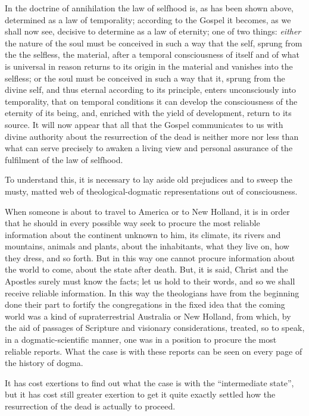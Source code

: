 \documentclass[12pt,a4paper,openany]{book}
\newcommand{\opage}[1]{\marginnote{\footnotesize\textit{[#1]}}}
\begin{document}
In the doctrine of annihilation the law of selfhood is, as has been
shown above, determined as a law of temporality; according to the Gospel
it becomes, as we shall now see, decisive to determine
as a law of eternity; one of two things: \emph{either} the nature of the soul
must be conceived in such a way that the self, sprung from the
\setcounter{footnote}{0}%
\opage{208}the selfless, the material, after a temporal consciousness of
itself and of what is universal in reason returns to its
origin in the material and vanishes into the selfless;
or the soul must be conceived in such a way that it, sprung
from the divine self, and thus eternal according to its principle,
enters unconsciously into temporality, that on temporal
conditions it can develop the consciousness of the eternity
of its being, and, enriched with the yield of development, return
to its source. It will now appear that all that
the Gospel communicates to us with divine authority about
the resurrection of the dead is neither more nor less than
what can serve precisely to awaken a living view
and personal assurance of the fulfilment of the law of selfhood.

To understand this, it is necessary to lay aside
old prejudices and to sweep the musty, matted web of
theological-dogmatic representations out of consciousness.

When someone is about to travel to America
or to New Holland, it is in order that he should in every
possible way seek to procure the most reliable
information about the continent unknown to him, its
climate, its rivers and mountains, animals and plants, about the inhabitants,
what they live on, how they dress, and so
forth.  But in this way one cannot procure
information about the world to come, about the state
after death.  But, it is said, Christ and the Apostles
surely must know the facts; let us hold to their words,
and so we shall receive reliable information.  In this way
the theologians have from the beginning done their part to
fortify the congregations in the fixed idea that the coming
world was a kind of supraterrestrial Australia or
\setcounter{footnote}{0}%
\opage{209}New Holland, from which, by the aid of passages of Scripture and visionary
considerations, treated, so to speak, in
a dogmatic-scientific manner, one was in a position to procure
the most reliable reports.  What
the case is with these reports can be seen on
every page of the history of dogma.

It has cost exertions to find out what
the case is with the ``intermediate state'', but it has
cost still greater exertion to get it quite exactly
settled how the resurrection of the
dead is actually to proceed.
\end{document}
